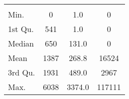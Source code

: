 \begin{tabular}{lS[table-format=5.1]S[table-format=5.1]S[table-format=5.1]}
&  &  &  \\
 Min.    & 0 & 1.0 & 0 \\
 1st Qu. & 541 & 1.0 & 0 \\
 Median  & 650 & 131.0 & 0 \\
 Mean    & 1387 & 268.8 & 16524 \\
 3rd Qu. & 1931 & 489.0 & 2967 \\
 Max.    & 6038 & 3374.0 & 117111 \\
\end{tabular}
